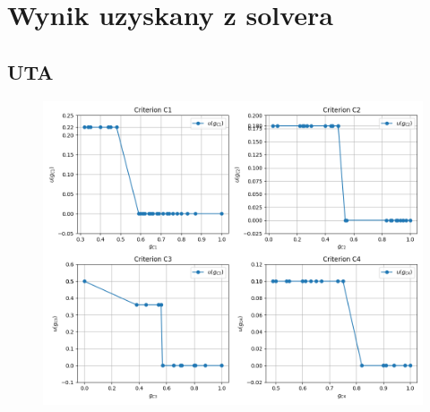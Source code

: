 \documentclass[11pt]{article}
\begin{document}
\section{Wynik uzyskany z solvera}\label{sec:wynik-uzyskany-z-solvera}
\subsection{UTA}
\begin{figure}[H]
	\centering
	\includegraphics[scale=0.6]{uta.png}
\end{figure}
\end{document}
